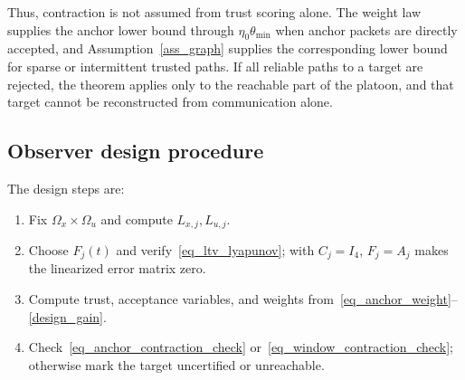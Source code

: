 \documentclass[letterpaper,journal]{IEEEtran}
\begin{document}
Thus, contraction is not assumed from trust scoring alone. The weight law supplies the anchor lower bound through $\eta_0\theta_{\min}$ when anchor packets are directly accepted, and Assumption~\ref{ass_graph} supplies the corresponding lower bound for sparse or intermittent trusted paths. If all reliable paths to a target are rejected, the theorem applies only to the reachable part of the platoon, and that target cannot be reconstructed from communication alone.

\subsection{Observer design procedure}
The design steps are:
\begin{enumerate}
    \item Fix $\Omega_x\times\Omega_u$ and compute $L_{x,j},L_{u,j}$.
    \item Choose $F_j(t)$ and verify~\eqref{eq_ltv_lyapunov}; with $C_j=I_4$, $F_j=A_j$ makes the linearized error matrix zero.
    \item Compute trust, acceptance variables, and weights from~\eqref{eq_anchor_weight}--\eqref{design_gain}.
    \item Check~\eqref{eq_anchor_contraction_check} or~\eqref{eq_window_contraction_check}; otherwise mark the target uncertified or unreachable.
\end{enumerate}
\end{document}
